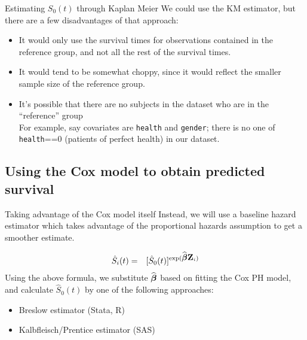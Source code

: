 \documentclass[envcountsect, 10pt, portrait, palatino]{beamer}
\newcommand{\bfbeta}{{\mbox{\boldmath$\beta$}}}
\newcommand{\bfZ}{{\mbox{{\bf Z}}}}
\begin{document}
\begin{frame}{Estimating $S_0(t)$ through Kaplan Meier}
We could use the KM estimator, but there are a few disadvantages of that approach:
\begin{itemize}
\item It would only use the survival times for observations contained
in the reference group, and not all the rest of the survival times.
\item It would tend to be somewhat choppy, since it would reflect
the smaller sample size of the reference group.
\item It's possible that there are no subjects in the dataset who
are in the ``reference'' group \\[2ex]
For example, say covariates are {\tt health} and {\tt gender};
there is no one of {\tt health}==0 (patients of perfect health) in our dataset.
\end{itemize}
\end{frame}
\subsection{Using the Cox model to obtain predicted survival}
\begin{frame}{Taking advantage of the Cox model itself}
Instead, we will use a baseline hazard estimator which
takes advantage of the proportional hazards assumption to get a
smoother estimate.

\begin{eqnarray*}
\hat{S}_i(t) & = & [\hat{S}_0(t)]^{\exp(\widehat\bfbeta\bfZ_i)}
\end{eqnarray*}
Using the above formula, we substitute $\widehat\bfbeta$ based on
fitting the Cox PH model, and calculate $\hat{S}_0(t)$ by
one of the following approaches:
\begin{itemize}
\item Breslow estimator (Stata, R)
\item Kalbfleisch/Prentice estimator (SAS)
\end{itemize}
\end{frame}
\end{document}
